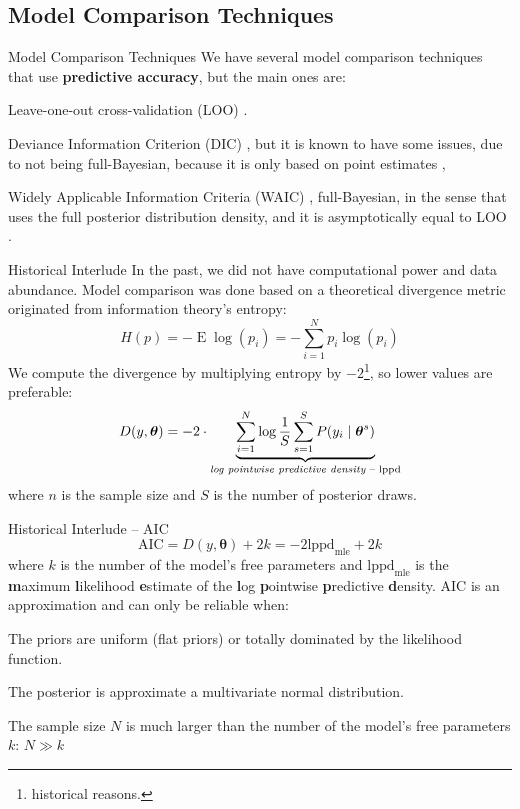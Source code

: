 \subsection{Model Comparison Techniques}
\begin{frame}{Model Comparison Techniques}
	We have several model comparison techniques that use \textbf{predictive accuracy},
	but the main ones are:
	\begin{vfilleditems}
		\item Leave-one-out cross-validation (LOO)
		\parencite{vehtariPracticalBayesianModel2015}.
		\item Deviance Information Criterion (DIC)
		\parencite{spiegelhalter2002bayesian},
		but it is known to have some issues,
		due to not being full-Bayesian,
		because it is only based on point estimates \parencite{van2005dic},
		\item Widely Applicable Information Criteria (WAIC) \parencite{watanabe2010asymptotic},
		full-Bayesian,
		in the sense that uses the full posterior distribution density,
		and it is asymptotically equal to LOO \parencite{vehtariPracticalBayesianModel2015}.
	\end{vfilleditems}
\end{frame}

\begin{frame}{Historical Interlude}
	\small
	In the past, we did not have computational power and data abundance.
	Model comparison was done based on a theoretical divergence metric
	originated from information theory's entropy:
	$$
		H(p) = - \operatorname{E}\log(p_i) = -\sum^N_{i=1} p_i \log(p_i)
	$$
	\small
	We compute the divergence by multiplying entropy by $-2$\footnote{historical reasons.},
	so lower values are preferable:
	$$
		D(y, \boldsymbol{\theta}) = -2 \cdot \underbrace{\sum^N_{i=1} \log \frac{1}{S}\sum^S_{s=1} P(y_i \mid \boldsymbol{\theta}^s)}_{\text{\textit{log pointwise predictive density} -- lppd}}
	$$
	\footnotesize
	where $n$ is the sample size and $S$ is the number of posterior draws.
\end{frame}

\begin{frame}{Historical Interlude -- AIC \parencite{akaike1998information}}
	$$
		\text{AIC} = D(y, \boldsymbol{\theta}) + 2k = -2 \text{lppd}_{\text{mle}} + 2k
	$$
	where $k$ is the number of the model's free parameters and
	$\text{lppd}_{\text{mle}}$ is the
	\textbf{m}aximum \textbf{l}ikelihood \textbf{e}stimate of the
	\textbf{l}og \textbf{p}ointwise \textbf{p}redictive \textbf{d}ensity.
	\vfill
	AIC is an approximation and can only be reliable when:
	\begin{vfilleditems}
		\item The priors are uniform (flat priors) or totally dominated by the likelihood function.
		\item The posterior is approximate a multivariate normal distribution.
		\item The sample size $N$ is much larger than the number of the model's free parameters $k$: $N \gg k$
	\end{vfilleditems}
\end{frame}

